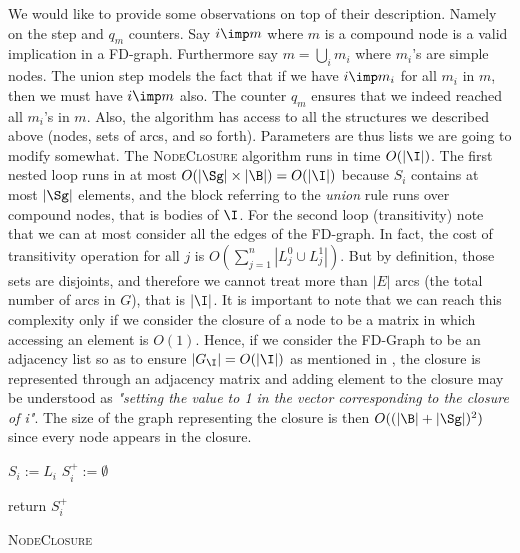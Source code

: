 We would like to provide some observations on top of their description. Namely 
on the  step and $q_m$ counters. Say $i \imp m$ where $m$ is a 
compound node is a valid implication in a FD-graph. Furthermore say $m = 
\bigcup_i m_i$ where $m_i$'s are simple nodes. The union step models the fact 
that if we have $i \imp m_i$ for all $m_i$ in $m$, then we must have $i \imp m$ 
also. The counter $q_m$ ensures that we indeed reached all $m_i$'s in $m$. 
Also, the algorithm has access to all the structures we described above (nodes, 
sets of arcs, and so forth). Parameters are thus lists we are going to modify 
somewhat. The \textsc{NodeClosure} algorithm runs in time $O(|\I|)$. The first 
nested loop runs in at most $O(|\Sg| \times |\B|) = O(|\I|)$ because 
$S_i$ contains at most $|\Sg|$ elements, and the block referring to the 
\textit{union} rule runs over compound nodes, that is bodies of $\I$. For the 
second loop (transitivity) note that we can at most consider all the edges of 
the FD-graph. In fact, the cost of transitivity operation for all $j$ is 
$O(\sum_{j = 1}^n |L_j^0 \cup L_j^1 |)$. But by definition, those sets are 
disjoints, and therefore we cannot treat more than $| E |$ arcs (the total 
number of arcs in $G$), that is $|\I|$. It is important to note that we can
reach this complexity only if we consider the closure of a node to be a matrix in which accessing an element is $O(1)$. Hence, if we consider the FD-Graph to be an adjacency list so as to ensure $|G_{\I}| = O(|\I|)$ as mentioned in \cite{ausiello_graph_1983, ausiello_minimal_1986}, the closure is represented 
through an adjacency matrix and adding element to the closure may be understood as \textit{"setting the value to 1 in the vector corresponding to the closure of i"}. The size of the graph representing the closure is then $O((|\B| + |\Sg|)^2)$ since every node appears in the closure.

\begin{algorithm}
	
	\BlankLine
	\BlankLine	
	
	$S_i := L_i$ \;
	$S_i^{+} := \emptyset$ \;
	
	return $S_i^+$ \;
	\caption{\textsc{NodeClosure}}
	\label{alg:FD-NodeClosure}
\end{algorithm}

